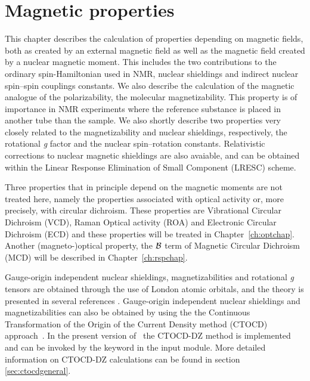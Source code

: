 \chapter{Magnetic properties}\label{ch:magnetic}

This chapter describes the calculation of properties depending on
magnetic fields, both as created by an external magnetic field as well
as the magnetic field created by a nuclear magnetic moment.
This includes the two
contributions to the ordinary spin-Hamiltonian used in NMR, nuclear
shieldings and indirect nuclear spin--spin
couplings constants. We
also describe the calculation of the magnetic analogue of the
polarizability, the molecular
magnetizability. This property
is of importance in NMR experiments where the reference substance is placed
in another tube than the sample. We also shortly describe
two properties very closely related to the magnetizability and nuclear
shieldings, respectively, the rotational {\em g} factor
and the nuclear spin--rotation constants.
Relativistic corrections to nuclear magnetic shieldings are also avaiable, and can be
obtained within the Linear Response Elimination of Small Component (LRESC) scheme. \cite{melojcp03}

Three properties that in principle depend on the %
magnetic moments are
not treated here, namely the properties associated with optical
activity or, more precisely, with circular dichroism. These
properties are Vibrational Circular Dichroism
(VCD), Raman
Optical activity (ROA) and
Electronic Circular Dichroism (ECD) and these properties will be treated in
Chapter~\ref{ch:optchap}.
Another (magneto-)optical property, the ${\cal{B}}$ term of
Magnetic Circular Dichroism (MCD) will be described in
Chapter~\ref{ch:rspchap}.

Gauge-origin
independent nuclear shieldings,
magnetizabilities and rotational {\em g} tensors are
obtained through the use of London atomic orbitals, and the theory is
presented in several references
\cite{kwjfhppjacs112,krthrkpjklbhjajjcp100,krthklbpjhjajjcp99,krthklbpjjocp195}.
Gauge-origin independent nuclear shieldings and
magnetizabilities can also be obtained by using the
the Continuous Transformation of the Origin of the Current Density method (CTOCD)
 approach~\cite{paololazz1,paololazz2,ctocd}. In the present
version of \dalton\ the CTOCD-DZ method is implemented and can be invoked by
the keyword  in the  input module.
More detailed information on CTOCD-DZ calculations can be found in section
\ref{sec:ctocdgeneral}.


